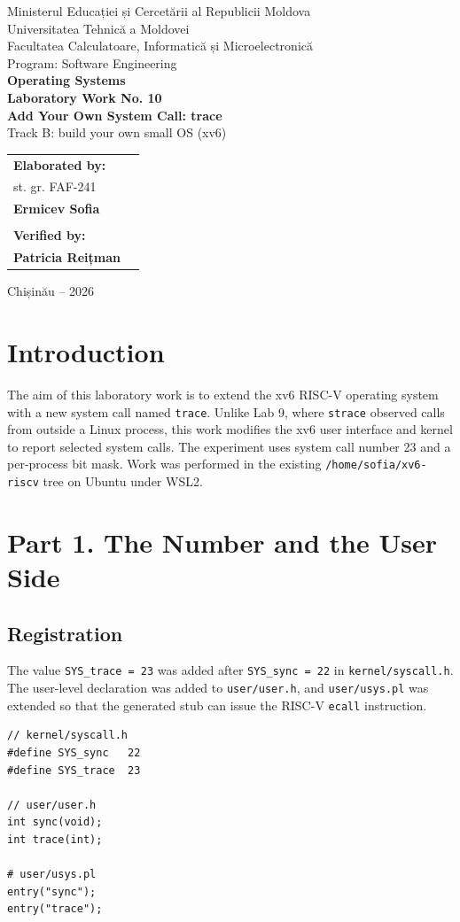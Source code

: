 \documentclass[12pt,a4paper]{article}
\begin{document}
\begin{titlepage}\begin{center}
{\large Ministerul Educației și Cercetării al Republicii Moldova}\\[.3cm]
{\large Universitatea Tehnică a Moldovei}\\[.3cm]
{\large Facultatea Calculatoare, Informatică și Microelectronică}\\[.3cm]
{\large Program: Software Engineering}\\[2.3cm]
{\Large\textbf{Operating Systems}}\\[.8cm]
{\LARGE\textbf{Laboratory Work No. 10}}\\[.5cm]
{\Large\textbf{Add Your Own System Call: trace}}\\[.35cm]
{\large Track B: build your own small OS (xv6)}
\vfill
\begin{flushright}\begin{tabular}{ll}
\textbf{Elaborated by:} & \\
st. gr. FAF-241 & \\
\textbf{Ermicev Sofia} & \\
\\
\textbf{Verified by:} & \\
\textbf{Patricia Reițman} &
\end{tabular}\end{flushright}
\vfill {\large Chișinău -- 2026}
\end{center}\end{titlepage}
\tableofcontents\newpage
\section{Introduction}
The aim of this laboratory work is to extend the xv6 RISC-V operating system with a new system call named \texttt{trace}. Unlike Lab 9, where \texttt{strace} observed calls from outside a Linux process, this work modifies the xv6 user interface and kernel to report selected system calls. The experiment uses system call number 23 and a per-process bit mask. Work was performed in the existing \texttt{/home/sofia/xv6-riscv} tree on Ubuntu under WSL2.

\section{Part 1. The Number and the User Side}
\subsection{Registration}
The value \texttt{SYS\_trace = 23} was added after \texttt{SYS\_sync = 22} in \texttt{kernel/syscall.h}. The user-level declaration was added to \texttt{user/user.h}, and \texttt{user/usys.pl} was extended so that the generated stub can issue the RISC-V \texttt{ecall} instruction.
\begin{lstlisting}
// kernel/syscall.h
#define SYS_sync   22
#define SYS_trace  23

// user/user.h
int sync(void);
int trace(int);

# user/usys.pl
entry("sync");
entry("trace");
\end{lstlisting}
\end{document}
